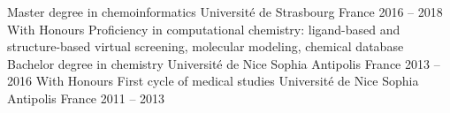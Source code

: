 

\begin{cventries}

  \cventryvar
    {Master degree in chemoinformatics}
    {Université de Strasbourg}
    {France}
    {2016 -- 2018}
    {
      \vspace{-1.2\baselineskip}With Honours
      \newline
      Proficiency in computational chemistry: ligand-based and structure-based virtual screening, molecular modeling, chemical database
    }
  \vspace{.5em}
  \cventryvar
    {Bachelor degree in chemistry}
    {Université de Nice Sophia Antipolis}
    {France}
    {2013 -- 2016}
    {\vspace{-1.2\baselineskip}With Honours}
  \vspace{.5em}
  \cventryvar
    {First cycle of medical studies}
    {Université de Nice Sophia Antipolis}
    {France}
    {2011 -- 2013}
    {}
  

\end{cventries}
